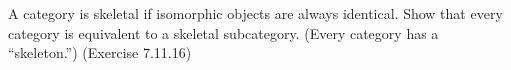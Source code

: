 A category is skeletal if isomorphic objects are always identical. Show that
every category is equivalent to a skeletal subcategory. (Every category has
a “skeleton.”) (Exercise 7.11.16)